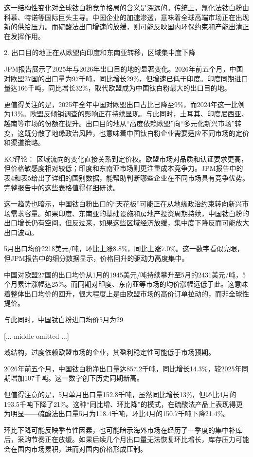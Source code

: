\documentclass[11pt]{ctexart}
\begin{document}
这一结构性变化对全球钛白粉竞争格局的含义是深远的。传统上，氯化法钛白粉由科慕、特诺等国际巨头主导。中国企业的加速渗透，意味着全球高端市场正在出现新的供给压力。而硫酸法出口增速的放缓，则可能反映国内环保约束和产能出清正在发挥作用。

2. 出口目的地正在从欧盟向印度和东南亚转移，区域集中度下降

JPM报告展示了2025年与2026年出口目的地的显著变化。2026年前五个月，中国对欧盟27国的出口量为97千吨，同比增长29\%，但增速已低于印度。印度同期进口量达166千吨，同比增长32\%，取代欧盟成为中国钛白粉最大的出口目的地。

更值得关注的是，2025年全年中国对欧盟出口占比已降至9\%，而2024年这一比例为13\%。欧盟反倾销调查的影响正在持续显现。与此同时，土耳其、印度尼西亚、越南等市场的份额在提升。出口目的地从“高度依赖欧盟”向“多元化新兴市场”转变，这既分散了地缘政治风险，也意味着中国钛白粉企业需要适应不同市场的定价和渠道策略。

KC评论： 区域流向的变化直接关系到定价权。欧盟市场对品质和认证要求更高，但价格敏感度相对较低；印度和东南亚市场则更注重成本竞争力。JPM报告中的表4和表5给出了详细的国别数据，能帮助判断哪些企业在不同市场具有竞争优势。完整报告中的这些表格值得仔细研读。

这一趋势也暗示，中国钛白粉出口的“天花板”可能正在从地缘政治约束转向新兴市场需求容量。如果印度、东南亚的基础设施和房地产投资周期持续，中国钛白粉的出口增长仍有空间。但反过来，如果这些区域经济放缓，集中度下降反而可能放大出口波动。

5月出口均价2218美元/吨，环比上涨8.8\%，同比上涨7.0\%。这一数字看似亮眼，但JPM报告中的细分数据显示，价格回升的驱动力高度集中。

中国对欧盟27国的出口均价从1月的1945美元/吨持续攀升至5月的2431美元/吨，5个月累计涨幅达25\%。而同期对印度、东南亚等市场的均价涨幅远低于此。这意味着整体出口均价的回升，很大程度上是由欧盟市场的高价订单拉动的，而非全球性提价。

与此同时，中国钛白粉进口均价5月为29

[... middle omitted ...]

域结构，过度依赖欧盟市场的企业，其盈利稳定性可能低于市场预期。

2026年前五个月，中国钛白粉净出口量达857.2千吨，同比增长14.3\%，较2025年同期增加107千吨。这一数字创下历史同期新高。

但值得注意的是，5月单月出口量152.8千吨，虽然同比增长13\%，但环比4月的193.5千吨下降了21\%。这种“同比增、环比降”的模式，在硫酸法产品上表现得更为明显——硫酸法出口量5月为118.4千吨，环比4月的150.7千吨下降21.4\%。

环比下降可能反映季节性因素，也可能暗示海外市场在经历了一季度的集中补库后，采购节奏正在放缓。如果后续几个月出口量无法恢复环比增长，库存压力可能会在国内市场累积，进而对国内价格形成压制。
\end{document}
